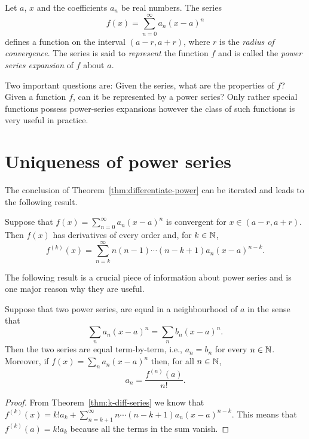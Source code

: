 Let \(a\), \(x\) and the coefficients \(a_n\) be real numbers.
The series
\[
  f(x) = \sum_{n=0}^{\infty} a_n {(x-a)}^n
\]
defines a function on the interval \((a-r,a+r)\),
where  \(r\)  is the \emph{radius of convergence}.
%
The series is said to \emph{represent} the function \(f\)
and is called the \emph{power series expansion} of \(f\) about \(a\).

Two important questions are: Given the series, what are the properties of \(f\)?
Given a function \(f\), can it be represented by a power series?
Only rather special functions possess power-series expansions however the class of such functions is very useful in practice.



\section{Uniqueness of power series}

The conclusion of Theorem~\ref{thm:differentiate-power} can be iterated and leads to the following result.

\begin{theorem}%
  \label{thm:k-diff-series}
  Suppose that \(f(x) = \sum_{n=0}^{\infty} a_n {(x-a)}^n\) is convergent for \(x\in (a-r,a+r)\).
  Then \(f(x)\) has derivatives of every order and, for \(k\in \mathbb{N}\),
  \[
    f^{(k)}(x) =\sum_{n=k}^{\infty} n(n-1)\cdots (n-k+1) a_n{(x-a)}^{n-k}.
  \]
\end{theorem}

The following result is a crucial piece of information about power series and is one major reason why they are useful.

\begin{theorem}%
  \label{thm:unique-power}
  Suppose that two power series, are equal in a neighbourhood of \(a\)
  in the sense that
  \[
    \sum_n a_n {(x-a)}^n = \sum_n b_n {(x-a)}^n.
  \]
  Then the two series are equal term-by-term, i.e.,
  \(a_n = b_n\) for every \(n\in \mathbb{N}\).
  Moreover, if \(f(x) = \sum_n a_n {(x-a)}^n\) then, for all \(n\in \mathbb{N}\),
  \[
    a_n = \frac{f^{(n)}(a)}{n!}.
  \]
\end{theorem}

\begin{proof}
  From Theorem~\ref{thm:k-diff-series} we know that
  \(f^{(k)}(x) = k! a_k + \displaystyle\sum_{n=k+1}^{\infty} n\cdots (n-k+1) a_n {(x-a)}^{n-k}\).
  This means that \(f^{(k)}(a) = k! a_k \) because all the terms in the sum vanish.
\end{proof}

